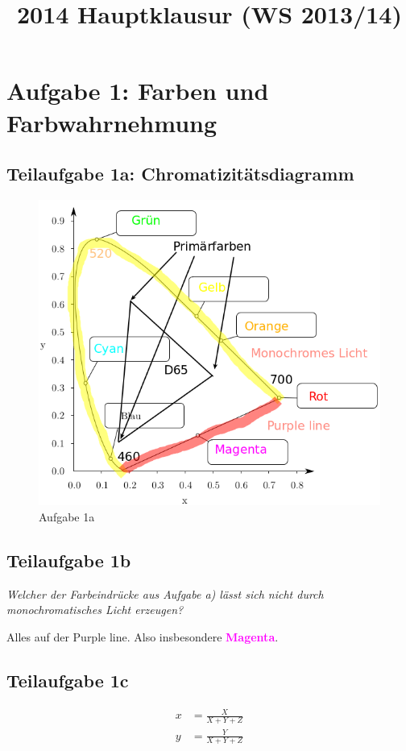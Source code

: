 \documentclass[a4paper]{scrartcl}
\begin{document}
\title{2014 Hauptklausur (WS 2013/14)}

\setcounter{section}{1}
\section*{Aufgabe 1: Farben und Farbwahrnehmung}
\subsection*{Teilaufgabe 1a: Chromatizitätsdiagramm}
\begin{figure}[h]
    \centering
    \includegraphics*[width=0.8\linewidth, keepaspectratio]{1a.png}
    \caption{Aufgabe 1a}
    \label{fig:1a}
\end{figure}

\subsection*{Teilaufgabe 1b}
\textit{Welcher der Farbeindrücke aus Aufgabe a) lässt sich nicht durch monochromatisches
Licht erzeugen?}

Alles auf der Purple line. Also insbesondere \textcolor{magenta}{\textbf{Magenta}}.

\subsection*{Teilaufgabe 1c}
\begin{align}
    x &= \frac{X}{X + Y + Z}\\
    y &= \frac{Y}{X + Y + Z}
\end{align}
\end{document}
